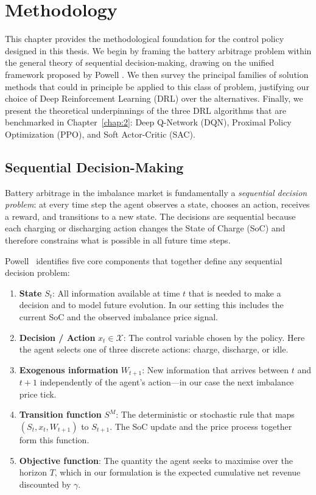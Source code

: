 \chapter{Methodology}
\label{chap:methodology}

This chapter provides the methodological foundation for the control policy designed in this thesis. We begin by framing the battery arbitrage problem within the general theory of sequential decision-making, drawing on the unified framework proposed by Powell \cite{powell2022reinforcement}. We then survey the principal families of solution methods that could in principle be applied to this class of problem, justifying our choice of Deep Reinforcement Learning (DRL) over the alternatives. Finally, we present the theoretical underpinnings of the three DRL algorithms that are benchmarked in Chapter~\ref{chap:2}: Deep Q-Network (DQN), Proximal Policy Optimization (PPO), and Soft Actor-Critic (SAC).

\section{Sequential Decision-Making}

Battery arbitrage in the imbalance market is fundamentally a \textit{sequential decision problem}: at every time step the agent observes a state, chooses an action, receives a reward, and transitions to a new state. The decisions are sequential because each charging or discharging action changes the State of Charge (SoC) and therefore constrains what is possible in all future time steps.

Powell~\cite{powell2022reinforcement} identifies five core components that together define any sequential decision problem:

\begin{enumerate}
    \item \textbf{State} $S_t$: All information available at time $t$ that is needed to make a decision and to model future evolution. In our setting this includes the current SoC and the observed imbalance price signal.
    \item \textbf{Decision / Action} $x_t \in \mathcal{X}$: The control variable chosen by the policy. Here the agent selects one of three discrete actions: charge, discharge, or idle.
    \item \textbf{Exogenous information} $W_{t+1}$: New information that arrives between $t$ and $t+1$ independently of the agent's action—in our case the next imbalance price tick.
    \item \textbf{Transition function} $S^M$: The deterministic or stochastic rule that maps $(S_t, x_t, W_{t+1})$ to $S_{t+1}$. The SoC update and the price process together form this function.
    \item \textbf{Objective function}: The quantity the agent seeks to maximise over the horizon $T$, which in our formulation is the expected cumulative net revenue discounted by $\gamma$.
\end{enumerate}

